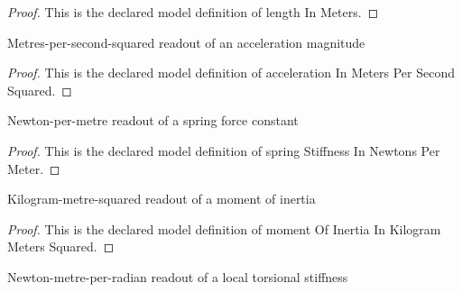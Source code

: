 \begin{proof}
  This is the declared model definition of length In Meters.
\end{proof}
\begin{definition}
  \label{def:physics:phyx-mini-0232:phyxminiproblems-problemphyxmini0232-accelerationinmeterspersecondsquared}
  Metres-per-second-squared readout of an acceleration magnitude
\end{definition}
\begin{proof}
  This is the declared model definition of acceleration In Meters Per Second Squared.
\end{proof}
\begin{definition}
  \label{def:physics:phyx-mini-0232:phyxminiproblems-problemphyxmini0232-springstiffnessinnewtonspermeter}
  Newton-per-metre readout of a spring force constant
\end{definition}
\begin{proof}
  This is the declared model definition of spring Stiffness In Newtons Per Meter.
\end{proof}
\begin{definition}
  \label{def:physics:phyx-mini-0232:phyxminiproblems-problemphyxmini0232-momentofinertiainkilogrammeterssquared}
  Kilogram-metre-squared readout of a moment of inertia
\end{definition}
\begin{proof}
  This is the declared model definition of moment Of Inertia In Kilogram Meters Squared.
\end{proof}
\begin{definition}
  \label{def:physics:phyx-mini-0232:phyxminiproblems-problemphyxmini0232-torsionalstiffnessinnewtonmetersperradian}
  Newton-metre-per-radian readout of a local torsional stiffness
\end{definition}
